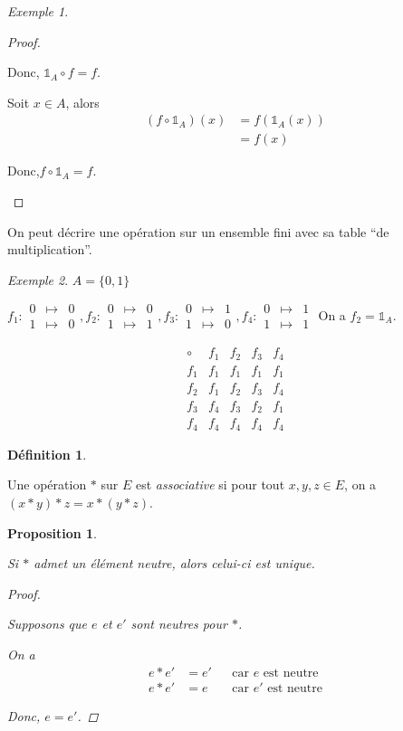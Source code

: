 \documentclass{report}
\newcommand*{\identite}{\mathds{1}}
\newtheorem*{prop}{Proposition}
\theoremstyle{definition}
\newtheorem*{defin}{D\'efinition}
\theoremstyle{remark}
\newtheorem*{exem}{Exemple}
\begin{document}
\begin{exem}
\begin{ulist}
\begin{proof}
\begin{nlist}
					Donc, $\identite_A \circ f=f$.
					\item Soit $x \in A$, alors
					\begin{align*}
						(f \circ \identite_A)(x)&= f(\identite_A(x))\\
						&=f(x)
					\end{align*}

					Donc,$f \circ \identite_A=f$.
				\end{nlist}
			\end{proof}
		\end{ulist}
	\end{exem}

	On peut d\'ecrire une op\'eration sur un ensemble fini avec sa table ``de multiplication''.
	\begin{exem}
		$A=\{0,1\}$

		$f_1:\begin{array}{rcl}
			0&\mapsto&0\\
			1&\mapsto&0
		\end{array},f_2:\begin{array}{rcl}
			0&\mapsto&0\\
			1&\mapsto&1
		\end{array},f_3:\begin{array}{rcl}
			0&\mapsto&1\\
			1&\mapsto&0
		\end{array},f_4:\begin{array}{rcl}
			0&\mapsto&1\\
			1&\mapsto&1
		\end{array}$
		On a $f_2=\identite_A$.

		\[
		\begin{array}{c||c|c|c|c}
			\circ&f_1&f_2&f_3&f_4\\
			\hline\hline
			f_1&f_1&f_1&f_1&f_1\\
			\hline
			f_2&f_1&f_2&f_3&f_4\\
			\hline
			f_3&f_4&f_3&f_2&f_1\\
			\hline
			f_4&f_4&f_4&f_4&f_4
		\end{array}
		\]
	\end{exem}
	\begin{defin}
		~

		Une op\'eration $*$ sur $E$ est \emph{associative} si pour tout $x,y,z \in E$, on a $(x*y)*z=x*(y*z)$.
	\end{defin}
	\begin{prop}
		~

		Si $*$ admet un \'el\'ement neutre, alors celui-ci est \emph{unique}.
		\begin{proof}~

			Supposons que $e$ et $e'$ sont neutres pour $*$.

			On a
			\begin{align*}
				e*e'&=e'&&\text{car $e$ est neutre}\\
				e*e'&=e&&\text{car $e'$ est neutre}
			\end{align*}

			Donc, $e=e'$.
		\end{proof}
	\end{prop}
\end{document}
